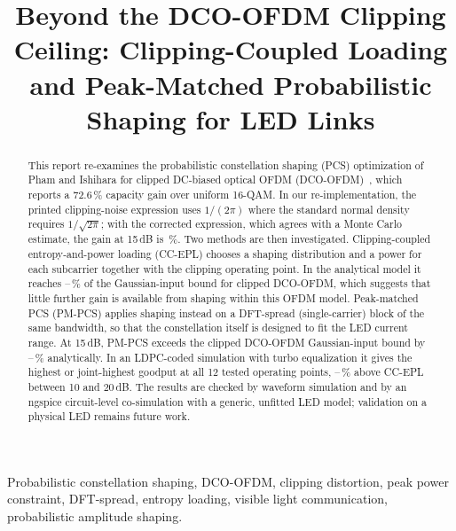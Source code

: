 \documentclass[conference]{IEEEtran}
\begin{document}
\title{Beyond the DCO-OFDM Clipping Ceiling: Clipping-Coupled Loading and Peak-Matched Probabilistic Shaping for LED Links}
\author{
}
\maketitle

\begin{abstract}
This report re-examines the probabilistic constellation shaping (PCS) optimization of Pham and Ishihara for clipped DC-biased optical OFDM (DCO-OFDM)~\cite{pham2026}, which reports a 72.6\,\% capacity gain over uniform 16-QAM. In our re-implementation, the printed clipping-noise expression uses $1/(2\pi)$ where the standard normal density requires $1/\sqrt{2\pi}$; with the corrected expression, which agrees with a Monte Carlo estimate, the gain at 15\,dB is \PCSgainCorrect\,\%. Two methods are then investigated. Clipping-coupled entropy-and-power loading (CC-EPL) chooses a shaping distribution and a power for each subcarrier together with the clipping operating point. In the analytical model it reaches \BoundMin--\BoundMax\,\% of the Gaussian-input bound for clipped DCO-OFDM, which suggests that little further gain is available from shaping within this OFDM model. Peak-matched PCS (PM-PCS) applies shaping instead on a DFT-spread (single-carrier) block of the same bandwidth, so that the constellation itself is designed to fit the LED current range. At 15\,dB, PM-PCS exceeds the clipped DCO-OFDM Gaussian-input bound by \PMboundMin--\PMboundMax\,\% analytically. In an LDPC-coded simulation with turbo equalization it gives the highest or joint-highest goodput at all 12 tested operating points, \PMcodedCCmin--\PMcodedCCmax\,\% above CC-EPL between 10 and 20\,dB. The results are checked by waveform simulation and by an ngspice circuit-level co-simulation with a generic, unfitted LED model; validation on a physical LED remains future work.
\end{abstract}

\begin{IEEEkeywords}
Probabilistic constellation shaping, DCO-OFDM, clipping distortion, peak power constraint, DFT-spread, entropy loading, visible light communication, probabilistic amplitude shaping.
\end{IEEEkeywords}
\end{document}
